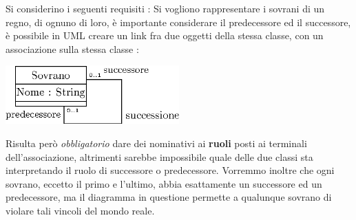 \documentclass[12pt, letterpaper]{article}
\begin{document}
Si considerino i seguenti requisiti : Si vogliono rappresentare i sovrani 
di un regno, di ognuno di loro, è importante considerare il predecessore 
ed il successore, è possibile in UML creare un link fra due oggetti della 
stessa classe, con un associazione sulla stessa classe : \begin{center}
    \includegraphics[width=0.5\textwidth ]{images/sovrani.eps}
\end{center}
Risulta però \textit{obbligatorio} dare dei nominativi ai \textbf{ruoli}
posti ai terminali dell'associazione, altrimenti sarebbe impossibile quale 
delle due classi sta interpretando il ruolo di successore o predecessore. 
Vorremmo inoltre che ogni sovrano, eccetto il primo e l'ultimo, abbia esattamente 
un successore ed un predecessore, ma il diagramma in questione permette a qualunque 
sovrano di violare tali vincoli del mondo reale.
\end{document}
